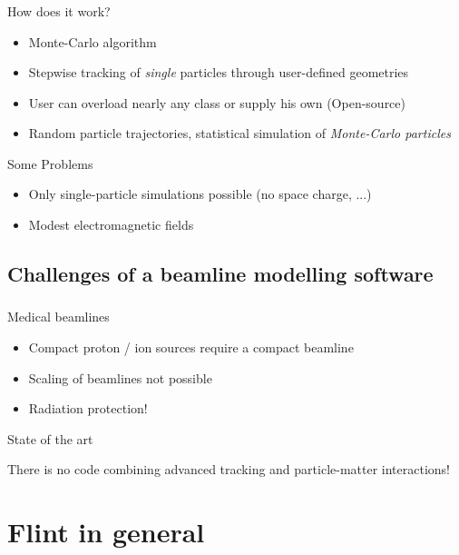\documentclass{beamer}
\newcommand{\ident}{\thesection.\thesubsection}
\newcommand{\mysubsection}[1]{\subsection{#1}\label{\ident}}
\newcommand{\ftitle}{\frametitle{\nameref{\ident}}}
\begin{document}
\begin{frame}
	\ftitle
	\begin{block}{How does it work?}
		\begin{itemize}
			\item Monte-Carlo algorithm
			\item Stepwise tracking of \emph{single} particles through user-defined geometries
			\item User can overload nearly any class or supply his own (Open-source)
			\item Random particle trajectories, statistical simulation of \emph{Monte-Carlo particles}
		\end{itemize}
	\end{block}
	\pause
	\begin{alertblock}{Some Problems}
		\begin{itemize}
			\item Only single-particle simulations possible (no space charge, ...)
			\item Modest electromagnetic fields
		\end{itemize}
	\end{alertblock}
\end{frame}

\mysubsection{Challenges of a beamline modelling software}

\begin{frame}
	\ftitle
	\begin{block}{Medical beamlines}
		\begin{itemize}
			\item Compact proton / ion sources require a compact beamline
			\item Scaling of beamlines not possible
			\item Radiation protection!
		\end{itemize}
	\end{block}
	\pause
	\begin{alertblock}{State of the art}
		\begin{center}
			There is no code combining advanced tracking and particle-matter interactions!
		\end{center}
	\end{alertblock}
\end{frame}

\section{Flint in general}
\end{document}
